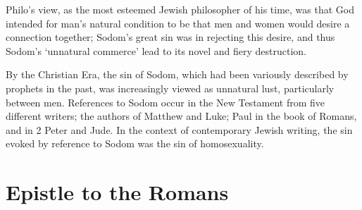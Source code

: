 \documentclass[10pt]{article}
\begin{document}
Philo's view, as the most esteemed Jewish philosopher of his time, was that God intended for man's natural condition to be that men and women would desire a connection together; Sodom's great sin was in rejecting this desire, and thus Sodom's `unnatural commerce' lead to its novel and fiery destruction. 

By the Christian Era, the sin of Sodom, which had been variously described by prophets in the past, was increasingly viewed as unnatural lust, particularly between men. References to Sodom occur in the New Testament from five different writers; the authors of Matthew and Luke; Paul in the book of Romans, and in 2 Peter and Jude. In the context of contemporary Jewish writing, the sin evoked by reference to Sodom was the sin of homosexuality. 







\section*{Epistle to the Romans}
\end{document}
